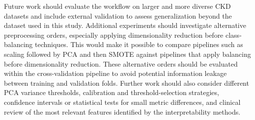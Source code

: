 Future work should evaluate the workflow on larger and more diverse CKD
datasets and include external validation to assess generalization beyond the
dataset used in this study. Additional experiments should investigate
alternative preprocessing orders, especially applying dimensionality reduction
before class-balancing techniques. This would make it possible to compare
pipelines such as scaling followed by PCA and then SMOTE against pipelines that
apply balancing before dimensionality reduction. These alternative orders should
be evaluated within the cross-validation pipeline to avoid potential
information leakage between training and validation folds. Further work should
also consider different PCA variance thresholds, calibration and
threshold-selection strategies, confidence intervals or statistical tests for
small metric differences, and clinical review of the most relevant features
identified by the interpretability methods.

